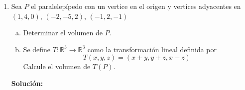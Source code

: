 \documentclass[12pt]{article}
\newenvironment{solucion}
{\begin{mdframed}[backgroundcolor=black!10]
		{\bf Solución:}\\
	}
	{
	\end{mdframed}
}
\newenvironment{preguntas}
{\begin{enumerate}\itemsep12pt
	}
	{
	\end{enumerate}
}
\newcommand{\ra}{\rightarrow}
\newcommand{\R}{\mathbb{R}}
\begin{document}
\begin{preguntas}
\begin{solucion}
\begin{enumerate}[a)]
\item Calcule  $det(5A)+det(3A^{-1})$ en terminos de $\alpha$.
			
			En primer lugar,
			$$det(5A) = 5^4det(a) = 5^4\alpha = 625 \alpha$$
			En segundo lugar,
			$$det(3A^{-1}) = 3^4det(A^{-1}) = 3^4 \dfrac{1}{\alpha} = \dfrac{81}{\alpha}$$
			Finalmente,
			$$det(5A)+det(3A^{-1}) = 625 \alpha + \dfrac{81}{\alpha}$$
\item Se sabe que $det(Adj(A))=8$. Calcule $\alpha$.
			
			Recordemos que
			$$A\ Adj(A) = det(A) I$$
			Apliquemos $det$ a ambos lados de la igualdad,
			$$det(A\ Adj(A)) = det(det(A) I)$$
			$$det(A)\ det(Adj(A)) = det(A)^4\ det(I)$$
			$$det(Adj(A)) = det(A)^3$$
			$$det(A) = \sqrt[3]{det(Adj(A))}$$
			$$det(A) = \sqrt[3]{8}$$
			$$det(A) = 2$$
\end{enumerate}
\end{solucion}
\item Sea $P$ el paralelepípedo con un vertice en el origen y vertices adyacentes en $(1,4,0)$, $(-2,-5,2)$, $(-1,2,-1)$
\begin{enumerate}[a)]
\item Determinar el volumen de $P$.
\item Se define $T: \R^3 \ra \R^3$ como la transformación lineal definida por $$T(x,y,z)=(x+y,y+z,x-z)$$
		Calcule el volumen de $T(P)$.
\end{enumerate}
\begin{solucion}


\end{solucion}
\end{preguntas}
\end{document}
